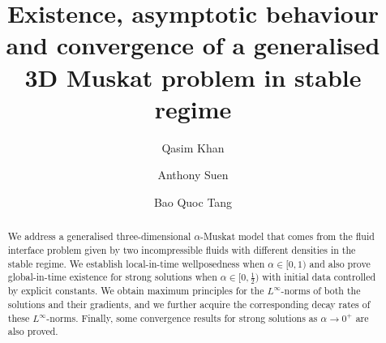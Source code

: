\documentclass[reqno]{amsart}%
\theoremstyle{definition}
\theoremstyle{remark}
\numberwithin{equation}{section}
\newcommand{\0}{\mathbf{0}}
\newcommand{\1}{\mathbf{1}}
\numberwithin{equation}{section}
\numberwithin{theorem}{section}
\numberwithin{figure}{section}
\begin{document}
%
%
%
%
%
%
%
%
%


\title[Generalised 3D Muskat problem]
 {Existence, asymptotic behaviour and convergence of a generalised 3D Muskat problem in stable regime}

\author{Qasim Khan}

\address{Department of Mathematics and Information Technology\\
The Education University of Hong Kong}


\author{Anthony Suen}

\address{Department of Mathematics and Information Technology\\
The Education University of Hong Kong}


\author{Bao Quoc Tang}

\address{Department of Mathematics and Scientific Computing \\
University of Graz, Graz, Austria}



\date{}



\begin{abstract}
We address a generalised three-dimensional $\alpha$-Muskat model that comes from the fluid interface problem given by two incompressible fluids with different densities in the stable regime. We establish local-in-time wellposedness when $\alpha\in[0,1)$ and also prove global-in-time existence for strong solutions when $\alpha\in[0,\frac{1}{2})$ with initial data controlled by explicit constants. We obtain maximum principles for the $L^{\infty}$-norms of both the solutions and their gradients, and we further acquire the corresponding decay rates of these $L^{\infty}$-norms. Finally, some convergence results for strong solutions as $\alpha\to0^+$ are also proved. 
\end{abstract}
\end{document}
